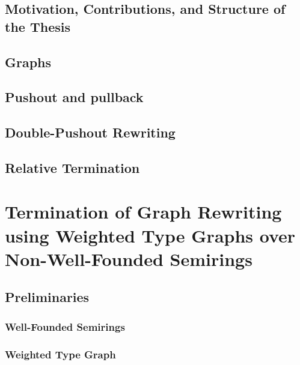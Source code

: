 \documentclass{report}
\begin{document}
\section{Motivation, Contributions, and Structure of the Thesis} 

\section{Graphs}
 
\section{Pushout and pullback}  

\section{Double-Pushout Rewriting}
 
\section{Relative Termination}



\chapter{Termination of Graph Rewriting using Weighted Type Graphs over Non-Well-Founded Semirings} 



\section{Preliminaries}
\subsection{Well-Founded Semirings} 
\label{sec:well_founded_semiring}

\subsection{Weighted Type Graph} 
\label{sec:weighted_type_graph}

%  
\end{document}
